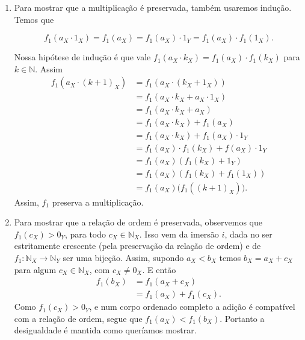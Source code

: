 \documentclass[../main.tex]{subfiles}
\begin{document}
\begin{dem}
\begin{enumerate}
\begin{enumerate}
            \item
                Para mostrar que a multiplicação é preservada, também usaremos indução.
                Temos que
                
                \[ f_1(a_X \cdot 1_X) = f_1(a_X) = f_1(a_X) \cdot 1_Y = f_1(a_X) \cdot f_1(1_X). \]
        
                Nossa hipótese de indução é que vale $f_1(a_X \cdot k_X) = f_1(a_X) \cdot f_1(k_X)$ para $k \in \mathbb{N}$. Assim
                \begin{align*}
                    f_1(a_X \cdot (k+1)_X)
                    &= f_1(a_X \cdot (k_X + 1_X))\\
                    &= f_1(a_X \cdot k_X + a_X \cdot 1_X) \\
                    &= f_1(a_X \cdot k_X + a_X) \\
                    &= f_1(a_X \cdot k_X) + f_1(a_X) \\
                    &= f_1(a_X \cdot k_X) + f_1(a_X) \cdot 1_Y \\
                    &= f_1(a_X) \cdot f_1(k_X) + f(a_X) \cdot 1_Y \\
                    &= f_1(a_X) (f_1(k_X) + 1_Y) \\
                    &= f_1(a_X) (f_1(k_X) + f_1(1_X)) \\
                    &= f_1(a_X) \big( f_1((k+1)_X) \big).
                \end{align*}
                Assim, $f_1$ preserva a multiplicação.

            \item Para mostrar que a relação de ordem é preservada, observemos que \\ 
            $f_1(c_X) > 0_Y$, para todo $c_X \in \mathbb{N}_X$. Isso vem da imersão $i$, dada no  ser estritamente crescente (pela preservação da relação de ordem) e de \\ $f_1 \colon \mathbb{N}_X \to \mathbb{N}_Y$ ser uma bijeção. Assim, supondo $a_X < b_X$ temos $b_X = a_X+c_X$ para algum $c_X \in \mathbb{N}_X$, com $c_X \neq 0_X$. E então
            \begin{align*}
                f_1(b_X) 
                &= f_1(a_X + c_X)\\
                &= f_1(a_X) + f_1(c_X).
            \end{align*}
            Como $f_1(c_X) > 0_Y$, e num corpo ordenado completo a adição é compatível com a relação de ordem, segue que $f_1(a_X) < f_1(b_X)$.
            Portanto a desigualdade é mantida como queríamos mostrar.            
        \end{enumerate}
    

\end{enumerate}
\end{dem}
\end{document}
